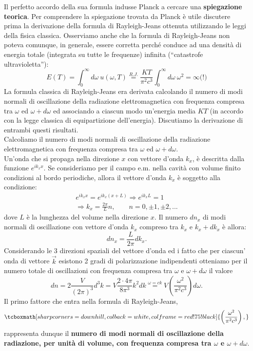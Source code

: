\documentclass[a4paper,12pt,oneside]{book}
\begin{document}
Il perfetto accordo della sua formula indusse Planck a cercare una \textbf{spiegazione teorica}. Per comprendere la spiegazione trovata da Planck è utile discutere prima la derivazione della formula di Rayleigh-Jeans ottenuta utilizzando le leggi della fisica classica. Osserviamo anche che la formula di  Rayleigh-Jeans non poteva comunque, in generale, essere corretta perché conduce ad una densità di energia totale (integrata su tutte le frequenze) infinita (``catastrofe ultravioletta''):
	\begin{equation}
		E(T) = \int _0 ^\infty d\omega\ u(\omega , T) \overset{R.J.}{=} \frac{KT}{\pi ^2 c ^3}\int _0 ^\infty d\omega \ \omega ^2 = \infty \textrm{(!)}
	\end{equation}
La formula classica di Rayleigh-Jeans era derivata calcolando il numero di modi normali di oscillazione della radiazione elettromagnetica con frequenza compresa tra $\omega$ ed $\omega + d\omega$ ed associando a ciascun modo un'energia media $KT$ (in accordo con la legge classica di equipartizione dell'energia). Discutiamo la derivazione di entrambi questi risultati.\\
Calcoliamo il numero di modi normali di oscillazione della radiazione elettromagnetica con frequenza compresa tra $\omega$ ed $\omega + d\omega$. \\
Un'onda che si propaga nella direzione $x$ con vettore d'onda $k_x$, è descritta dalla funzione $e^{ik_x x}$. Se consideriamo per il campo e.m. nella cavità con volume finito condizioni al bordo periodiche, allora il vettore d'onda $k_x$ è soggetto alla condizione:
	\begin{eqnarray}
		e^{ik_x x}= e^{ik_x (x+L)} \Rightarrow e^{ik_x L}=1  \nonumber\\ \Rightarrow k_x=\frac{2\pi}{L}n, \qquad n= 0, \pm 1, \pm 2,...
	\end{eqnarray}
dove $L$ è la lunghezza del volume nella direzione $x$. Il numero $dn_x$ di modi normali di oscillazione con vettore d'onda $k_x$ compreso tra $k_x$ e $k_x+dk_x$ è allora:
	\begin{equation}
		dn_x =\frac{L}{2\pi}dk_x.
	\end{equation}
Considerando le 3 direzioni spaziali del vettore d'onda ed i fatto che per ciascun' onda di vettore $\vec{k}$ esistono 2 gradi di polarizzazione indipendenti otteniamo per il numero totale di oscillazioni con frequenza compresa tra $\omega$ e $\omega + d\omega$ il valore
	\begin{equation}
		dn =2\frac{V}{(2\pi)^3}d^3k= V \frac{2\cdot 4\pi}{8\pi ^3} k^2 dk \overset{\omega =ck}{=} V \left( \frac{\omega ^2}{\pi ^2 c^3}\right) d\omega .
	\end{equation}
Il primo fattore che entra nella formula di Rayleigh-Jeans,
	\begin{equation}
		\tcboxmath[sharp corners=downhill ,colback=white,colframe=red!75!black]{
			\left( \frac{\omega ^2}{\pi ^2 c^3} \right) ,
		}
		\label{eq:cap1_1}
	\end{equation}
rappresenta dunque il \textbf{numero di modi normali di oscillazione della radiazione, per unità di volume, con frequenza compresa tra $\omega$ e $\omega + d\omega$}.\\
\end{document}
